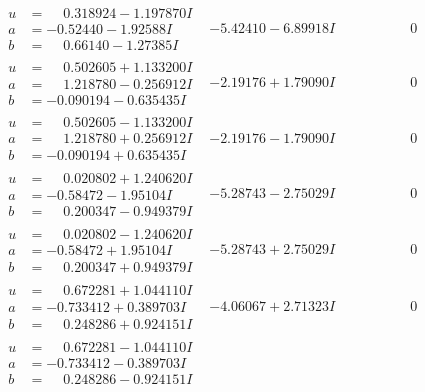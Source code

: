 \documentclass[1p]{elsarticle_modified}
\theoremstyle{definition}
\begin{document}
$$\begin{array}{c|c|c}
\begin{aligned}
u &= \phantom{-}0.318924 - 1.197870 I \\
a &= -0.52440 - 1.92588 I \\
b &= \phantom{-}0.66140 - 1.27385 I\end{aligned}
 & -5.42410 - 6.89918 I & \phantom{-0.000000 } 0 \\ \hline\begin{aligned}
u &= \phantom{-}0.502605 + 1.133200 I \\
a &= \phantom{-}1.218780 - 0.256912 I \\
b &= -0.090194 - 0.635435 I\end{aligned}
 & -2.19176 + 1.79090 I & \phantom{-0.000000 } 0 \\ \hline\begin{aligned}
u &= \phantom{-}0.502605 - 1.133200 I \\
a &= \phantom{-}1.218780 + 0.256912 I \\
b &= -0.090194 + 0.635435 I\end{aligned}
 & -2.19176 - 1.79090 I & \phantom{-0.000000 } 0 \\ \hline\begin{aligned}
u &= \phantom{-}0.020802 + 1.240620 I \\
a &= -0.58472 - 1.95104 I \\
b &= \phantom{-}0.200347 - 0.949379 I\end{aligned}
 & -5.28743 - 2.75029 I & \phantom{-0.000000 } 0 \\ \hline\begin{aligned}
u &= \phantom{-}0.020802 - 1.240620 I \\
a &= -0.58472 + 1.95104 I \\
b &= \phantom{-}0.200347 + 0.949379 I\end{aligned}
 & -5.28743 + 2.75029 I & \phantom{-0.000000 } 0 \\ \hline\begin{aligned}
u &= \phantom{-}0.672281 + 1.044110 I \\
a &= -0.733412 + 0.389703 I \\
b &= \phantom{-}0.248286 + 0.924151 I\end{aligned}
 & -4.06067 + 2.71323 I & \phantom{-0.000000 } 0 \\ \hline\begin{aligned}
u &= \phantom{-}0.672281 - 1.044110 I \\
a &= -0.733412 - 0.389703 I \\
b &= \phantom{-}0.248286 - 0.924151 I\end{aligned}

\end{array}$$
\end{document}
